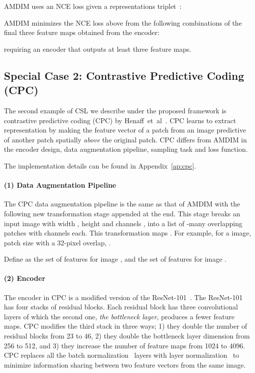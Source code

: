 \documentclass{article}
\begin{document}
AMDIM uses an NCE loss  given a representations triplet~\cite{mnih2013learning}:


AMDIM minimizes the NCE loss above from the following combinations of the final three feature maps obtained from the encoder:

requiring an encoder that outputs at least three feature maps.

\subsection{Special Case 2: Contrastive Predictive Coding (CPC)} 
\label{sec: cpc}

The second example of CSL we describe under the proposed framework is contrastive predictive coding (CPC) by Henaff~et~al~\cite{henaff2019data}. CPC learns to extract representation by making the feature vector of a patch from an image predictive of another patch spatially {\it above} the original patch. CPC differs from AMDIM in the encoder design, data augmentation pipeline, sampling task and loss function.

The implementation details can be found in Appendix~\ref{ap:cpc}.

\paragraph{(1) Data Augmentation Pipeline}   

The CPC data augmentation pipeline is the same as that of AMDIM with the following new transformation stage  appended at the end. This stage   breaks an input image  with width , height  and channels , into a list of -many  overlapping patches with  channels each. This transformation maps . For example, for a  image, patch size  with a 32-pixel overlap, .

Define  as the set of features for image , and  the set of features for image .

\paragraph{(2) Encoder}  

The encoder  in CPC is a modified version of the ResNet-101~\cite{he2016deep}. The ResNet-101 has four stacks of residual blocks. Each residual block has three convolutional layers of which the second one, \textit{the bottleneck layer}, produces a fewer feature maps. CPC modifies the third stack in three ways; 1) they double the number of residual blocks from 23 to 46, 2) they double the bottleneck layer dimension from 256 to 512, and 3) they increase the number of feature maps from 1024 to 4096. CPC replaces all the batch normalization~\cite{ioffe2015batch} layers with layer normalization~\cite{ba2016layer} to minimize information sharing between two feature vectors from the same image.
\end{document}
